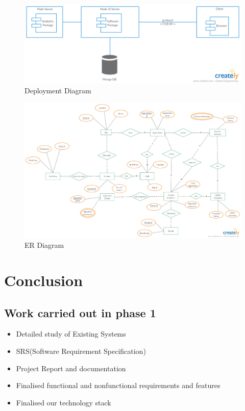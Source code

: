 \documentclass[a4paper,12pt]{report}
\begin{document}
        \begin{figure}[h]
          \includegraphics[width=1\textwidth]{images/Deployment.png}
          \caption{ Deployment Diagram}  
        \end{figure}

        \newpage
        \begin{figure}[h]
          \includegraphics[width=8.5in ,angle=90]{images/ER.jpg}
        \caption{ ER Diagram}  
        \end{figure}

    \chapter {Conclusion}
    \section{Work carried out in phase 1}
    \begin{itemize}
      \item  Detailed study of Existing Systems
      \item  SRS(Software Requirement Specification)
      \item  Project Report and documentation
      \item  Finalised functional and nonfunctional requirements and features
      \item  Finalised our technology stack
    \end{itemize}
\end{document}
